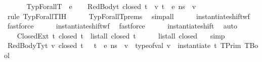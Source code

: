 \begin{isabellebody}
\ \ \isamarkupfalse%
\isanewline
{}\isamarkupfalse%
\isanewline
\ \ \isamarkupfalse%
\ {\isacharparenleft}{\kern0pt}TypForallT\ {\isasymDelta}\ e{\isacharparenright}{\kern0pt}\isanewline
\ \ \isamarkupfalse%
\ RedBody{\isacharcolon}{\kern0pt}{\isachardoublequoteopen}{\isasymAnd}t{\isachardot}{\kern0pt}\ closed\ t\ {\isasymLongrightarrow}\ {\isacharparenleft}{\kern0pt}{\isasymexists}v{\isachardot}{\kern0pt}\ {\isasymLambda}{\isacharcomma}{\kern0pt}{\isasymGamma}{\isacharcomma}{\kern0pt}t{\isacharhash}{\kern0pt}{\isasymOmega}\ {\isasymturnstile}\ {\isasymlangle}e{\isacharcomma}{\kern0pt}\ n{\isacharunderscore}{\kern0pt}s{\isasymrangle}\ {\isasymDown}\ v{\isacharparenright}{\kern0pt}{\isachardoublequoteclose}\ \ \ \ \isanewline
\ \ \ \ \isamarkupfalse%
\ {\isacharparenleft}{\kern0pt}rule\ TypForallT{\isachardot}{\kern0pt}IH{\isacharparenright}{\kern0pt}\isanewline
\ \ \ \ \isamarkupfalse%
\ TypForallT{\isachardot}{\kern0pt}prems\ \isamarkupfalse%
\ simp{\isacharunderscore}{\kern0pt}all\isanewline
\ \ \ \ \isamarkupfalse%
\ instantiate{\isacharunderscore}{\kern0pt}shift{\isacharunderscore}{\kern0pt}wf\ \isamarkupfalse%
\ fastforce\isanewline
\ \ \ \ \isamarkupfalse%
\ instantiate{\isacharunderscore}{\kern0pt}shift{\isacharunderscore}{\kern0pt}wf\ \isamarkupfalse%
\ fastforce\isanewline
\ \ \ \ \isamarkupfalse%
\ instantiate{\isacharunderscore}{\kern0pt}shift\ \isamarkupfalse%
\ auto\isanewline
\ \ \ \ \isamarkupfalse%
\isanewline
\isanewline
\ \ \isamarkupfalse%
\ Closed{\isasymOmega}Ext{\isacharcolon}{\kern0pt}\ {\isachardoublequoteopen}{\isasymAnd}t{\isachardot}{\kern0pt}\ closed\ t\ {\isasymLongrightarrow}\ list{\isacharunderscore}{\kern0pt}all\ closed\ {\isacharparenleft}{\kern0pt}t{\isacharhash}{\kern0pt}{\isasymOmega}{\isacharparenright}{\kern0pt}{\isachardoublequoteclose}\isanewline
\ \ \ \ \isamarkupfalse%
\ {\isacartoucheopen}list{\isacharunderscore}{\kern0pt}all\ closed\ {\isasymOmega}{\isacartoucheclose}\ \isamarkupfalse%
\ simp\isanewline
\isanewline
\ \ \isamarkupfalse%
\ RedBodyTy{\isacharcolon}{\kern0pt}{\isachardoublequoteopen}{\isasymAnd}t\ v{\isachardot}{\kern0pt}\ closed\ t\ {\isasymLongrightarrow}\ {\isasymLambda}{\isacharcomma}{\kern0pt}{\isasymGamma}{\isacharcomma}{\kern0pt}\ t{\isacharhash}{\kern0pt}{\isasymOmega}\ {\isasymturnstile}\ {\isasymlangle}e{\isacharcomma}{\kern0pt}\ n{\isacharunderscore}{\kern0pt}s{\isasymrangle}\ {\isasymDown}\ v\ {\isasymLongrightarrow}\ type{\isacharunderscore}{\kern0pt}of{\isacharunderscore}{\kern0pt}val\ v\ {\isacharequal}{\kern0pt}\ instantiate\ {\isacharparenleft}{\kern0pt}t{\isacharhash}{\kern0pt}{\isasymOmega}{\isacharparenright}{\kern0pt}\ {\isacharparenleft}{\kern0pt}TPrim\ TBool{\isacharparenright}{\kern0pt}{\isachardoublequoteclose}\isanewline

\end{isabellebody}
